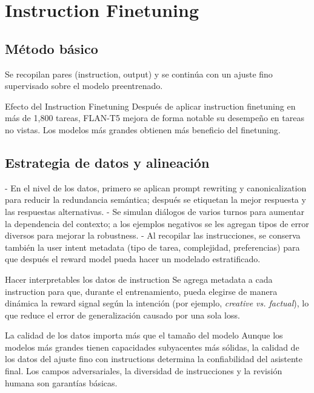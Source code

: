 \section{Instruction Finetuning}

\subsection{Método básico}

Se recopilan pares (instruction, output) y se continúa con un ajuste fino supervisado sobre el modelo preentrenado.

\begin{importantbox}{Efecto del Instruction Finetuning}
Después de aplicar instruction finetuning en más de 1,800 tareas, FLAN-T5 mejora de forma notable su desempeño en tareas no vistas. Los modelos más grandes obtienen más beneficio del finetuning.
\end{importantbox}

\subsection{Estrategia de datos y alineación}

- En el nivel de los datos, primero se aplican prompt rewriting y canonicalization para reducir la redundancia semántica; después se etiquetan la mejor respuesta y las respuestas alternativas.
- Se simulan diálogos de varios turnos para aumentar la dependencia del contexto; a los ejemplos negativos se les agregan tipos de error diversos para mejorar la robustness.
- Al recopilar las instrucciones, se conserva también la user intent metadata (tipo de tarea, complejidad, preferencias) para que después el reward model pueda hacer un modelado estratificado.

\begin{knowledgebox}{Hacer interpretables los datos de instruction}
Se agrega metadata a cada instruction para que, durante el entrenamiento, pueda elegirse de manera dinámica la reward signal según la intención (por ejemplo, \textit{creative vs. factual}), lo que reduce el error de generalización causado por una sola loss.
\end{knowledgebox}

\begin{importantbox}{La calidad de los datos importa más que el tamaño del modelo}
Aunque los modelos más grandes tienen capacidades subyacentes más sólidas, la calidad de los datos del ajuste fino con instructions determina la confiabilidad del asistente final. Los campos adversariales, la diversidad de instrucciones y la revisión humana son garantías básicas.
\end{importantbox}

